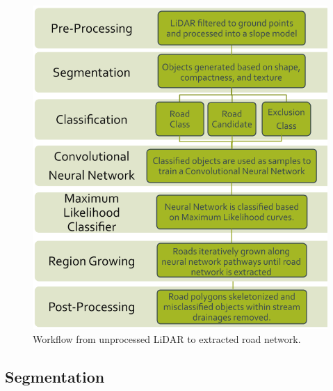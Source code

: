 \documentclass[remotesensing,article,accept,pdftex,moreauthors]{Definitions/mdpi}
\begin{document}
\begin{figure}[H]
\includegraphics[width=10.5 cm]{workflow.png}
\caption{Workflow from unprocessed LiDAR to extracted road network. \label{fig3}}
\end{figure}    

\subsection{Segmentation}
\end{document}

